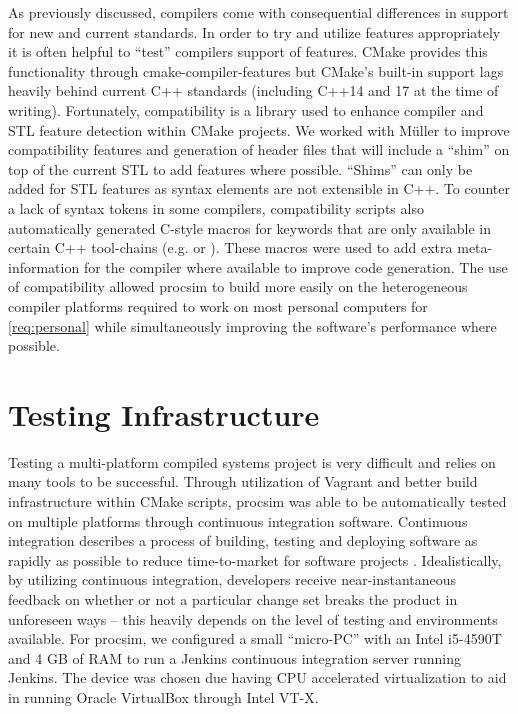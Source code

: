 As previously discussed, compilers come with consequential differences in support for new and current standards. In order to try and utilize features appropriately it is often helpful to ``test'' compilers support of features. CMake provides this functionality through cmake-compiler-features \cite{CMake:compile-features} but CMake's built-in support lags heavily behind current C++ standards (including C++14 and 17 at the time of writing). Fortunately, compatibility \cite{CMakeCompatibility} is a library used to enhance compiler and STL feature detection within CMake projects. We worked with M\"uller to improve compatibility features and generation of header files that will include a ``shim'' on top of the current STL to add features where possible. ``Shims'' can only be added for STL features as syntax elements are not extensible in C++. To counter a lack of syntax tokens in some compilers, compatibility scripts also automatically generated C-style macros for keywords that are only available in certain C++ tool-chains (e.g.  or ). These macros were used to add extra meta-information for the compiler where available to improve code generation. The use of compatibility allowed procsim to build more easily on the heterogeneous compiler platforms required to work on most personal computers for \cref{req:personal} while simultaneously improving the software's performance where possible.

\section{Testing Infrastructure}

Testing a multi-platform compiled systems project is very difficult and relies on many tools to be successful. Through utilization of Vagrant and better build infrastructure within CMake scripts, procsim was able to be automatically tested on multiple platforms through continuous integration software. Continuous integration describes a process of building, testing and deploying software as rapidly as possible to reduce time-to-market for software projects \cite{Stolberg2009}. Idealistically, by utilizing continuous integration, developers receive near-instantaneous feedback on whether or not a particular change set breaks the product in unforeseen ways -- this heavily depends on the level of testing and environments available. For procsim, we configured a small ``micro-PC'' with an Intel \textregistered{} i5-4590T and 4 GB of RAM to run a Jenkins \cite{Jenkins:Home} continuous integration server running Jenkins. The device was chosen due having CPU accelerated virtualization to aid in running Oracle VirtualBox through Intel VT-X.  

